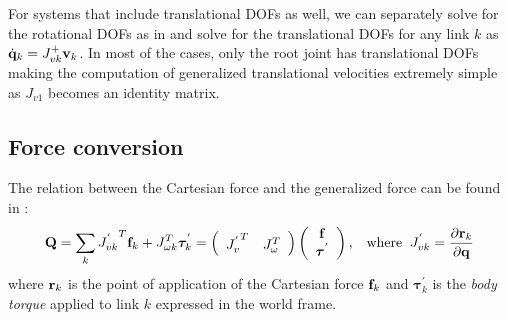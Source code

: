 For systems that include translational DOFs as well, we can separately solve for the rotational DOFs as in  and solve for the translational DOFs for any link $k$ as $\dot{\mathbf{q}}_k = J_{vk}^+\mathbf{v}_k$. In most of the cases, only the root joint has translational DOFs making the computation of generalized translational velocities extremely simple as $J_{v1}$ becomes an identity matrix.


\subsection{Force conversion}
The relation between the Cartesian force and the generalized force can
be found in :
\begin{equation}
\label{eq:force_conversion}
\mathbf{Q} = \sum_k {J^{'}_{vk}}^T \mathbf{f}_k + J_{\omega k}^T \bm{\tau}^{'}_k = 
\left (
\begin{array}{cc}
{J^{'}_{v}}^T & J_\omega^T
\end{array}
\right)
\left(
\begin{array}{c}
\mathbf{f} \\
\bm{\tau}^{'}
\end{array}
\right) 
, \;\;\;\mathrm{where}\;\;
J^{'}_{vk} = \frac{\partial \mathbf{r}_k}{\partial \mathbf{q}}
\end{equation}
where $\mathbf{r}_k$ is the point of application of the Cartesian force
$\mathbf{f}_k$ and $\bm{\tau}^{'}_k$ is the \emph{body torque} applied to
link $k$ expressed in the world frame.

